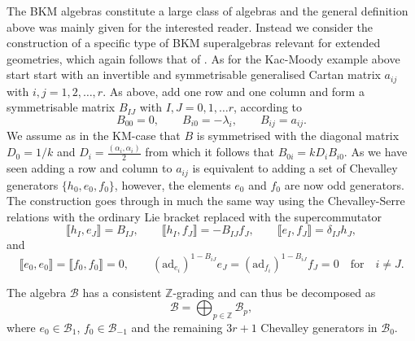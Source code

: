 The BKM algebras constitute a large class of algebras and the general definition above was mainly given for the interested reader. Instead we consider the construction of a specific type of BKM superalgebras relevant for extended geometries, which again follows that of \cite{CederwallPalmkvist2017}. As for the Kac-Moody example above start start with an invertible and symmetrisable generalised Cartan matrix $a_{ij}$ with $i,j=1,2,\ldots,r$. As above, add one row and one column and form a symmetrisable matrix $B_{IJ}$ with $I,J=0,1,\ldots r$, according to 
\begin{equation}
    B_{00} = 0,\qquad B_{i0} = -\lambda_i,\qquad B_{ij} = a_{ij}.
\end{equation}
We assume as in the KM-case that $B$ is symmetrised with the diagonal matrix $D_0=1/k$ and $D_i=\frac{(\alpha_i,\alpha_i)}{2}$ from which it follows that $B_{0i}=kD_iB_{i0}$. As we have seen adding a row and column to $a_{ij}$ is equivalent to adding a set of Chevalley generators $\{h_0,e_0,f_0\}$, however, the elements $e_0$ and $f_0$ are now odd generators. The construction goes through in much the same way using the Chevalley-Serre relations with the ordinary Lie bracket replaced with the supercommutator 
\begin{equation}
    \llbracket h_I,e_J\rrbracket = B_{IJ},\qquad \llbracket h_I,f_J\rrbracket = -B_{IJ}f_J,\qquad \llbracket e_I,f_J\rrbracket = \delta_{IJ}h_J,
\end{equation}
and 
\begin{equation}
    \llbracket e_0,e_0\rrbracket = \llbracket f_0,f_0\rrbracket = 0,\qquad (\text{ad}_{e_i})^{1-B_{iJ}}e_J = (\text{ad}_{f_i})^{1-B_{iJ}}f_J = 0 \quad \text{for} \quad i\neq J.
\end{equation}

The algebra $\mathscr{B}$ has a consistent $\mathbb{Z}$-grading and can thus be decomposed as 
\begin{equation}
    \mathscr{B} = \bigoplus_{p\in\mathbb{Z}} \mathscr{B}_p,
\end{equation}
where $e_0\in\mathscr{B}_{1}$, $f_0\in\mathscr{B}_{-1}$ and the remaining $3r+1$ Chevalley generators in $\mathscr{B}_0$. 


